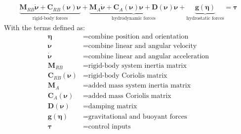 \begin{gather}
\underbrace{\boldsymbol{M}_{R B} \dot{\boldsymbol{\nu}}+\boldsymbol{C}_{R B}(\boldsymbol{\nu}) \boldsymbol{\nu}}_{\text {rigid-body forces}}+\underbrace{\boldsymbol{M}_{A} \dot{\boldsymbol{\nu}}+\boldsymbol{C}_{A}\left(\boldsymbol{\nu}\right) \boldsymbol{\nu}+\boldsymbol{D}\left(\boldsymbol{\nu}\right) \boldsymbol{\nu}}_{\text {hydrodynamic forces}}+\underbrace{\boldsymbol{g}(\boldsymbol{\eta})}_{\text{hydrostatic forces}}=\boldsymbol{\tau}
\label{eqm}
\end{gather}
With the terms defined as:
\begin{align*}
    \boldsymbol{\eta}&=\text{combine position and orientation}\\
    \boldsymbol{\nu}&=\text{combine linear and angular velocity}\\
    \dot{\boldsymbol{\nu}}&=\text{combine linear and angular acceleration}\\
    \boldsymbol{M}_{R B}&=\text{rigid-body system inertia matrix}\\
    \boldsymbol{C}_{R B}(\boldsymbol{\nu})&=\text{rigid-body Coriolis matrix}\\
    \boldsymbol{M}_{A}&=\text{added mass system inertia matrix}\\
    \boldsymbol{C}_{A}(\boldsymbol{\nu})&=\text{added mass Coriolis matrix}\\
    \boldsymbol{D}(\boldsymbol{\nu})&=\text{damping matrix}\\
    \boldsymbol{g}(\boldsymbol{\eta})&=\text{gravitational and buoyant forces}\\
    \boldsymbol{\tau}&=\text{control inputs}
\end{align*}


